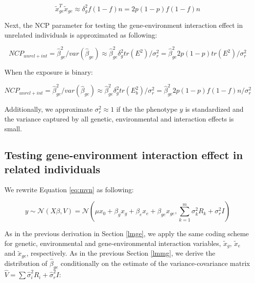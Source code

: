 \documentclass[]{book}
\begin{document}
\begin{equation}
\tilde{x}_{ge}^T \tilde{x}_{ge} \approx \delta_g^2 f (1 - f) n = 2 p (1 - p) f (1 - f) n
\label{eq:varbetahatlmgbin}
\end{equation}

Next, the NCP parameter for testing the gene-environment interaction
effect in unrelated individuals is approximated as following:

\begin{equation}
NCP_{unrel + int} = \hat{\beta}_{ge}^2 / var(\hat{\beta}_{ge}) \approx \hat{\beta}_{ge}^2 \delta_g^2 tr(E^2) / \sigma_r^2 = \hat{\beta}_{ge}^2 2 p (1 - p) tr(E^2) / \sigma_r^2
\label{eq:ncplmge}
\end{equation}

When the exposure is binary:

\begin{equation}
NCP_{unrel + int} = \hat{\beta}_{ge}^2 / var(\hat{\beta}_{ge}) \approx \hat{\beta}_{ge}^2 \delta_g^2 tr(E_b^2) / \sigma_r^2 = \hat{\beta}_{ge}^2 2 p (1 - p) f (1 - f) n / \sigma_r^2
\label{eq:ncplmgebin}
\end{equation}

Additionally, we approximate \(\sigma_r^2 \approx 1\) if the the
phenotype \(y\) is standardized and the variance captured by all
genetic, environmental and interaction effects is small.

\subsection{Testing gene-environment interaction effect in related
individuals}\label{lmmge}

We rewrite Equation \eqref{eq:mvn} as following:

\begin{equation}
  y \sim \mathcal{N} (X \beta, V) = \mathcal{N} (\mu x_0 + \beta_g x_g + \beta_e x_e + \beta_{ge} x_{ge}, \sum_{k=1}^{m}{\sigma_k^2 R_k} + \sigma_r^2 I) 
\label{eq:lmmge}
\end{equation}

As in the previous derivation in Section \ref{lmge}, we apply the same
coding scheme for genetic, environmental and gene-environmental
interaction variables, \(\tilde{x}_g\), \(\tilde{x}_e\) and
\(\tilde{x}_{ge}\), respectively. As in the previous Section \ref{lmmg},
we derive the distribution of \(\hat{\beta}_{ge}\) conditionally on the
estimate of the variance-covariance matrix
\(\hat{V} = \sum{\hat{\sigma}_i^2 R_i} + \hat{\sigma}_r^2 I\):
\end{document}
